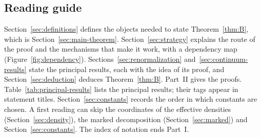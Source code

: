 \subsection{Reading guide}\label{sec:reading-guide}

Section~\ref{sec:definitions} defines the objects needed to state Theorem~\ref{thm:B}, which is Section~\ref{sec:main-theorem}. Section~\ref{sec:strategy} explains the route of the proof and the mechanisms that make it work, with a dependency map (Figure~\ref{fig:dependency}). Sections~\ref{sec:renormalization} and~\ref{sec:continuum-results} state the principal results, each with the idea of its proof, and Section~\ref{sec:deduction} deduces Theorem~\ref{thm:B}. Part~II gives the proofs. Table~\ref{tab:principal-results} lists the principal results; their tags appear in statement titles. Section~\ref{sec:constants} records the order in which constants are chosen. A first reading can skip the coordinates of the effective densities (Section~\ref{sec:density}), the marked decomposition (Section~\ref{sec:marked}) and Section~\ref{sec:constants}. The index of notation ends Part~I.

